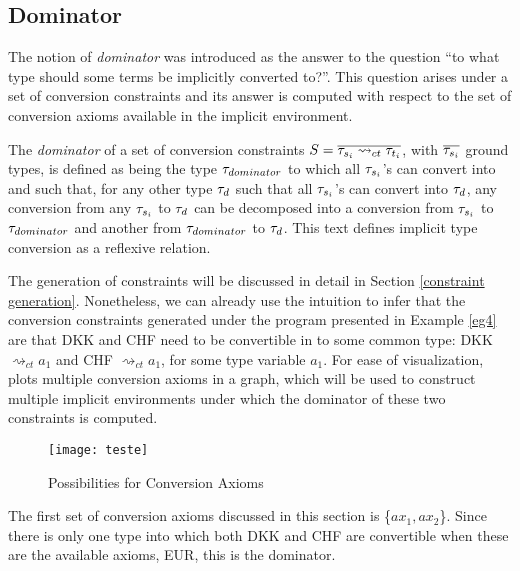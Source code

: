 
\subsection{Dominator}
\label{dom4}
The notion of \textit{dominator} was introduced as the answer to the question ``to what type should some terms be implicitly converted to?''. This question arises under a set of conversion constraints and its answer is computed with respect to the set of conversion axioms available in the implicit environment.

The \textit{dominator} of a set of conversion constraints $S=\overline{\mathit{\tau}_{s_i}\rightsquigarrow_{ct} \mathit{\tau}_{t_i}}$, with $\overline{\mathit{\tau}_{s_i}}$ ground types, is defined as being the type $\mathit{\tau}_{dominator}$ to which all $\mathit{\tau}_{s_i}$'s can convert into and such that, for any other type $\mathit{\tau}_d$ such that  all $\mathit{\tau}_{s_i}$'s can convert into $\mathit{\tau}_d$, any conversion from any $\mathit{\tau}_{s_i}$ to $\mathit{\tau}_d$ can be decomposed into a conversion from $\mathit{\tau}_{s_i}$ to $\mathit{\tau}_{dominator}$ and another from $\mathit{\tau}_{dominator}$ to $\mathit{\tau}_d$. This text defines implicit type conversion as a reflexive relation.

The generation of constraints will be discussed in detail in Section \ref{constraint generation}. Nonetheless, we can already use the intuition to infer that the conversion constraints generated under the program presented in Example \ref{eg4} are that DKK and CHF need to be convertible in to some common type: DKK $\rightsquigarrow_{ct} a_1$ and CHF $\rightsquigarrow_{ct} a_1$, for some type variable $a_1$. For ease of visualization,  plots multiple conversion axioms in a graph, which will be used to construct multiple implicit environments under which the dominator of these two constraints is computed.
\begin{figure}
  \centering
  \texttt{[image: teste]}
  \caption{Possibilities for Conversion Axioms}
  \label{dom4pic}
\end{figure}

The first set of conversion axioms discussed in this section is \{$ax_1,ax_2$\}. Since there is only one type into which both DKK and CHF are convertible when these are the available axioms, EUR, this is the dominator.

